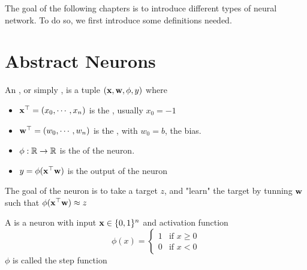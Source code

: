 The goal of the following chapters is to introduce different types of neural network. To do so, we first introduce some definitions needed. 

\section{Abstract Neurons}\label{abstractneurons}

\begin{definition}
    An , or simply , is a tuple $(\vx,\vw,\phi,y)$ where
    \begin{itemize}
        \item $\vx^\top = (x_0,\cdots,x_n)$ is the , usually $x_0=-1$
        \item $\vw^\top = (w_0,\cdots,w_n)$ is the , with $w_0 = b$, the bias.
        \item $\phi:\R\to\R$ is the  of the neuron.
        \item $y=\phi(\vx^\top\vw)$ is the output of the neuron
    \end{itemize}
\end{definition}

The goal of the neuron is to take a target $z$, and "learn" the target by tunning $\vw$ such that $\phi(\vx^\top\vw) \approx z$ 

\begin{definition}
    A  is a neuron with input $\vx\in\{0,1\}^n$ and activation function
    \begin{equation*}
        \phi(x) = 
        \begin{cases}
            1 & \text{if } x \geq 0\\
            0 & \text{if } x < 0
        \end{cases}
    \end{equation*}
    $\phi$ is called the  step function
\end{definition}

